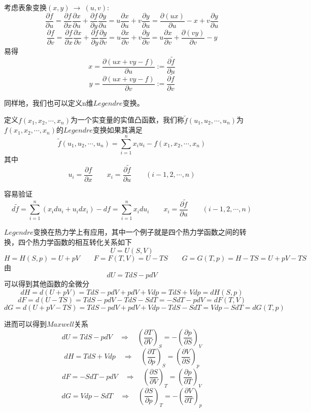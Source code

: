 考虑表象变换$(x,y) \ \rightarrow \ (u,v)$:
\[\frac{\partial f}{\partial u}=\frac{\partial f}{\partial x}\frac{\partial x}{\partial u}+\frac{\partial f}{\partial y}\frac{\partial y}{\partial u}=u\frac{\partial x}{\partial u}+v\frac{\partial y}{\partial u}=\frac{\partial (ux)}{\partial u}-x+v\frac{\partial y}{\partial u}\]
\[\frac{\partial f}{\partial v}=\frac{\partial f}{\partial x}\frac{\partial x}{\partial v}+\frac{\partial f}{\partial y}\frac{\partial y}{\partial v}=u\frac{\partial x}{\partial v}+v\frac{\partial y}{\partial v}=u\frac{\partial x}{\partial v}+\frac{\partial (vy)}{\partial v}-y\]
易得
\[x=\frac{\partial (ux+vy-f)}{\partial u}:=\frac{\partial \tilde{f}}{\partial u}\]
\[y=\frac{\partial (ux+vy-f)}{\partial v}:=\frac{\partial \tilde{f}}{\partial v}\]

同样地，我们也可以定义n维$Legendre$变换。

\begin{definition}[n维$Legendre$变换]
    定义$f(x_1,x_2,\cdots,x_n)$为一个实变量的实值凸函数，我们称$\tilde{f}(u_1,u_2,\cdots,u_n)$为$f(x_1,x_2,\cdots,x_n)$的$Legendre$变换如果其满足
    \[\tilde{f}(u_1,u_2,\cdots,u_n)=\sum_{i=1}^nx_iu_i-f(x_1,x_2,\cdots,x_n)\]
    其中
    \[u_i=\frac{\partial f}{\partial x} \qquad x_i=\frac{\partial \tilde{f}}{\partial u} \qquad (i-1,2,\cdots,n)\]
\end{definition}

容易验证
\[d\tilde{f}=\sum_{i=1}^n(x_idu_i+u_idx_i)-df=\sum_{i=1}^nx_idu_i \qquad x_i=\frac{\partial \tilde{f}}{\partial u} \qquad (i-1,2,\cdots,n)\]

$Legendre$变换在热力学上有应用，其中一个例子就是四个热力学函数之间的转换，四个热力学函数的相互转化关系如下
\[U=U(S,V)\]
\[H=H(S,p)=U+pV \qquad F=F(T,V)=U-TS \qquad G=G(T,p)=H-TS=U+pV-TS\]
由
\[dU=TdS-pdV\]
可以得到其他函数的全微分
\[dH=d(U+pV)=TdS-pdV+pdV+Vdp=TdS+Vdp=dH(S,p)\]
\[dF=d(U-TS)=TdS-pdV-TdS-SdT=-SdT-pdV=dF(T,V)\]
\[dG=d(U+pV-TS)=TdS-pdV+pdV+Vdp-TdS-SdT=Vdp-SdT=dG(T,p)\]

进而可以得到$Maxwell$关系
\[dU=TdS-pdV \quad \Rightarrow \quad \left(\frac{\partial T}{\partial V}\right)_S=-\left(\frac{\partial p}{\partial S}\right)_V\]
\[dH=TdS+Vdp \quad \Rightarrow \quad \left(\frac{\partial T}{\partial p}\right)_S=\left(\frac{\partial V}{\partial S}\right)_p\]
\[dF=-SdT-pdV \quad \Rightarrow \quad \left(\frac{\partial S}{\partial V}\right)_T=\left(\frac{\partial p}{\partial T}\right)_V\]
\[dG=Vdp-SdT \quad \Rightarrow \quad \left(\frac{\partial S}{\partial p}\right)_T=-\left(\frac{\partial V}{\partial T}\right)_p\]

